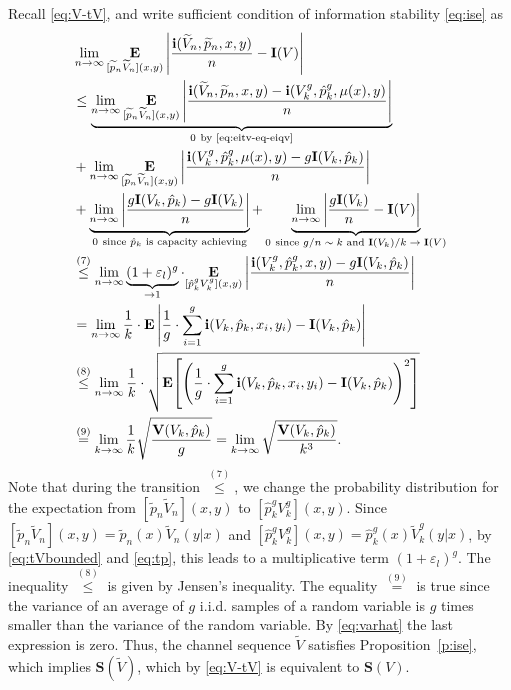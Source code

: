 \documentclass[journal, twocol]{IEEEtran}
\newcommand{\tp}{{\widetilde{p}}}
\newcommand{\hp}{{\hat{p}}}
\newcommand{\bfE}{{\mathbf{E}}}
\newcommand{\bfI}{{\mathbf{I}}}
\newcommand{\bfS}{{\mathbf{S}}}
\newcommand{\bfV}{{\mathbf{V}}}
\newcommand{\tV}{{\widetilde{V}}}
\newcommand{\abs}[1]{\left|{#1}\right|}
\newcommand{\br}[1]{{\left({#1}\right)}}
\newcommand{\brsq}[1]{{\left[{#1}\right]}}
\newcommand{\ve}{\varepsilon}
\newcommand{\bi}{\mathbf{i}}
\newcommand{\pW}[2]{[{#1}{#2}]}
\newcommand{\pWd}[2]{[{#1}{#2}]}
\begin{document}
Recall \eqref{eq:V-tV}, and write sufficient condition of information stability \eqref{eq:ise} as
{\allowdisplaybreaks
\begin{align}
&\lim_{n\to\infty}\underset{\pWd{\tp_n}{\tV_n}(x,y)}{\bfE}\abs{\frac{\bi(\tV_n,\tp_n,x,y)}{n}-\bfI(V)}
\nonumber\\&
\leq
\underbrace{
\lim_{n\to\infty}
\underset{\pWd{\tp_n}{\tV_n}(x,y)}{\bfE}
\abs{\frac{\bi(\tV_n,\tp_n,x,y)-\bi(V_k^g,\hp^g_k,\mu(x),y)}{n}}
}_{0~\text{by \eqref{eq:eitv-eq-eiqv}}}
\nonumber\\&+
\lim_{n\to\infty}
\underset{\pWd{\tp_n}{\tV_n}(x,y)}{\bfE}
\abs{\frac{\bi(V_k^g,\hp^g_k,\mu(x),y)-g\bfI(V_{k},\hp_k)}{n}}
\nonumber\\&+
\underbrace{\lim_{n\to\infty}
\abs{\frac{g\bfI(V_k,\hp_k)-g\bfI(V_k)}{n}}}_{0\ \text{since $\hp_k$ is capacity achieving}}
+
\underbrace{\lim_{n\to\infty}
\abs{\frac{g\bfI(V_{k})}{n}-\bfI(V)}}_{0\ \text{since $g/n\sim k$ and $\bfI(V_k)/k\to\bfI(V)$}}
\nonumber\\&
\overset{(7)}{\leq}
\lim_{n\to\infty} \underbrace{(1+\ve_l)^g}_{\to 1}\cdot
\underset{\pW{\hp_k^g}{V_k^g}(x,y)}{\bfE}
\abs{\frac{\bi(V_k^g,\hp^g_k,x,y)-g\bfI(V_k,\hp_k)}{n}}
\nonumber\\&
=
\lim_{n\to\infty} 
\frac{1}{k}\cdot \bfE
\abs{\frac{1}{g}\cdot \sum_{i=1}^g\bi(V_k,\hp_k,x_i,y_i)-\bfI(V_k,\hp_k)}
\nonumber\\&
\overset{(8)}{\leq}
\lim_{n\to\infty} 
\frac{1}{k}\cdot \sqrt{\bfE\brsq{
\br{\frac{1}{g}\cdot \sum_{i=1}^g\bi(V_k,\hp_k,x_i,y_i)-\bfI(V_k,\hp_k)}^2}}
\nonumber\\&
\overset{(9)}{=}
\lim_{k\to\infty}\frac{1}{k}\sqrt{\frac{\bfV(V_k,\hp_k)}{g}}
=
\lim_{k\to\infty}\sqrt{\frac{\bfV(V_k,\hp_k)}{k^3}}.
\label{eq:EitV}
\end{align}
}%
Note that during the transition $\overset{(7)}{\leq}$, we change the probability distribution for the expectation from $\pW{\tp_n}{\tV_n}(x,y)$ to $\pW{\hp_k^g}{V_k^g}(x,y)$. 
Since $\pWd{\tp_n}{\tV_n}(x,y)=\tp_n(x)\tV_n(y|x)$ and $\pW{\hp_k^g}{V_k^g}(x,y)=\hp^g_k(x)\tV^g_k(y|x)$,
by \eqref{eq:tVbounded} and \eqref{eq:tp}, this leads to a multiplicative term $(1+\ve_l)^g$.
The inequality $\overset{(8)}{\leq}$ is given by Jensen's inequality. 
The equality $\overset{(9)}{=}$ is true since the variance of an average of $g$ i.i.d. samples of a random variable is $g$ times smaller than the variance of the random variable.
By \eqref{eq:varhat} the last expression is zero.
Thus, the channel sequence $\tV$ satisfies Proposition~\ref{p:ise}, which implies $\bfS(\tV)$, which by \eqref{eq:V-tV} is equivalent to $\bfS(V)$.
\end{document}
